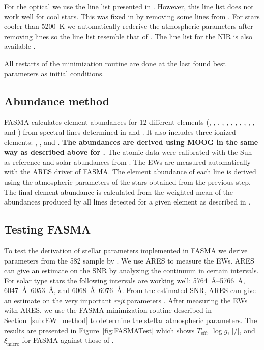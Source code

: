 \documentclass{aa}
\begin{document}
For the optical we use the line list presented in \citet{Sousa2008a}. However,
this line list does not work well for cool stars. This was fixed in
\citet{Tsantaki2013} by removing some lines from \citet{Sousa2008a}. For stars
cooler than \SI{5200}{K} we automatically rederive the atmospheric parameters
after removing lines so the line list resemble that of \citet{Tsantaki2013}. The
line list for the NIR is also available \citep{Andreasen2016}.

All restarts of the minimization routine are done at the last found best
parameters as initial conditions.


\subsection{Abundance method}
\label{sub:Abundance_method}

FASMA calculates element abundances for 12 different elements (,
, , , , , ,
, , , , and ) from spectral
lines determined in \citet{Neves2009} and \citet{Adibekyan2012}. It also
includes three ionized elements: , , and .
{\bf The abundances are derived using MOOG in the same way as described above
for .} The atomic data were calibrated with the Sun as reference and
solar abundances from \citet{Anders1989}. The EWs are measured automatically
with the ARES driver of FASMA. The element abundance of each line is derived
using the atmospheric parameters of the stars obtained from the previous step.
The final element abundance is calculated from the weighted mean of the
abundances produced by all lines detected for a given element as described in
\citet{Adibekyan2015b}.


\subsection{Testing FASMA}
\label{sub:Testing_FASMA}

To test the derivation of stellar parameters implemented in FASMA we derive
parameters from the 582 sample by \citet{Sousa2011}. We use ARES to measure the
EWs. ARES can give an estimate on the SNR by analyzing the continuum in certain
intervals. For solar type stars the following intervals are working well:
\SIrange{5764}{5766}{\angstrom}, \SIrange{6047}{6053}{\angstrom}, and
\SIrange{6068}{6076}{\angstrom}. From the estimated SNR, ARES can give an
estimate on the very important \emph{rejt} parameters
\citep[see][for more information]{Sousa2015a}. After measuring the EWs with ARES,
we use the FASMA minimization routine described in Section~\ref{sub:EW_method}
to determine the stellar atmospheric parameters. The results are presented in
Figure~\ref{fig:FASMATest} which shows $T_\mathrm{eff}$, $\log g$,
[/], and $\xi_\mathrm{micro}$ for FASMA against those of
\citet{Sousa2011}.
\end{document}
